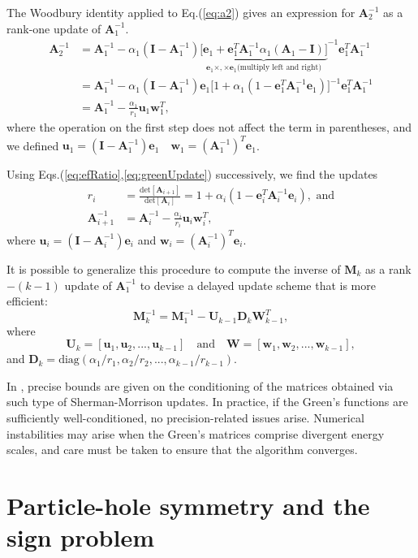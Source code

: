 The Woodbury identity applied to Eq.(\ref{eq:a2}) gives an expression for $\bm A_2^{-1}$ as a rank-one update of $\bm A_1^{-1}$.
\begin{equation}\label{eq:greenUpdate}
\begin{split}
\bm A_2^{-1} &= \bm A_1^{-1} - \alpha_1 ( \bm I - \bm A_1^{-1} ) {\underbrace{\bigg[ \bm e_1 + \bm e_1^T \bm A_1^{-1} \alpha_1 (  \bm A_1 - \bm I ) \bigg]}_{\bm e_1 \times, \times \bm e_1 \text{(multiply left and right)}}}^{-1} \bm e_1^T \bm A_1^{-1} \\
&= \bm A_1^{-1} - \alpha_1 ( \bm I - \bm A_1^{-1} ) \bm e_1 \bigg[ 1 + \alpha_1 ( 1 - \bm e_1^T \bm A_1^{-1} \bm e_1 ) \bigg]^{-1} \bm e_1^T \bm A_1^{-1}  \\
&= \bm A_1^{-1} - \frac{\alpha_1}{r_1} \bm u_1 \bm w_1^T ,
\end{split}
\end{equation}
where the operation on the first step does not affect the term in parentheses, and we defined
$
\bm u_1 = (\bm I - \bm A_1^{-1} ) \bm e_1 \quad \bm w_1 = (\bm A_1^{-1})^T \bm e_1
$.

Using Eqs.(\ref{eq:efRatio},\ref{eq:greenUpdate}) successively, we find the updates
\begin{equation}
\begin{split}
r_i &= \frac{\text{det}[\bm A_{i+1}]}{\text{det}[\bm A_{i}]} = 1 + \alpha_i ( 1 - \bm e_i^T \bm A_i^{-1}  \bm e_i ) , \,\, \text{and} \\
\bm A_{i+1}^{-1} &= \bm A_i^{-1} - \frac{\alpha_i}{r_i} \bm u_i \bm w_i^T ,
\end{split}
\end{equation}
where $\bm u_i = (\bm I - \bm A_i^{-1} ) \bm e_i$ and $\bm w_i = (\bm A_i^{-1})^T \bm e_i$.

It is possible to generalize this procedure to compute the inverse of $\bm M_k$ as a rank$-(k-1)$ update of $\bm A_1^{-1}$ to devise a delayed update scheme that is more efficient:
\begin{equation}
\bm M_k^{-1} = \bm M_1^{-1} - \bm U_{k-1} \bm D_k \bm W_{k-1}^T ,
\end{equation}
where
\begin{equation}
\bm U_k = [ \bm u_1 , \bm u_2, ..., \bm u_{k-1} ] \quad \text{and} \quad \bm W = [ \bm w_1, \bm w_2, ..., \bm w_{k-1} ] ,
\end{equation}
and $\bm D_k = \text{diag}(\alpha_1 / r_1, \alpha_2 / r_2, ..., \alpha_{k-1} / r_{k-1})$.

In \cite{yip_note_1986}, precise bounds are given on the conditioning of the matrices obtained via such type of Sherman-Morrison updates.
In practice, if the Green's functions are sufficiently well-conditioned, no precision-related issues arise.
Numerical instabilities may arise when the Green's matrices comprise divergent energy scales, and care must be taken to ensure that the algorithm converges.

\section{Particle-hole symmetry and the sign problem}\label{sec:phsSign}